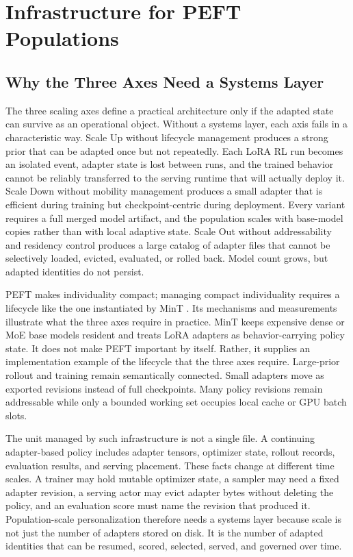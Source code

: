 \documentclass{llmxive}
\providecommand{\pony}[1]{#1}
\begin{document}
\section{\pony{Infrastructure for PEFT Populations}}\label{sec:infrastructure}

\subsection{\pony{Why the Three Axes Need a Systems Layer}}\label{subsec:infra-three-axes}

\pony{The three scaling axes define a practical architecture only if the adapted state can survive as an operational object. Without a systems layer, each axis fails in a characteristic way. Scale Up without lifecycle management produces a strong prior that can be adapted once but not repeatedly. Each LoRA RL run becomes an isolated event, adapter state is lost between runs, and the trained behavior cannot be reliably transferred to the serving runtime that will actually deploy it. Scale Down without mobility management produces a small adapter that is efficient during training but checkpoint-centric during deployment. Every variant requires a full merged model artifact, and the population scales with base-model copies rather than with local adaptive state. Scale Out without addressability and residency control produces a large catalog of adapter files that cannot be selectively loaded, evicted, evaluated, or rolled back. Model count grows, but adapted identities do not persist.}

\pony{PEFT makes individuality compact; managing compact individuality requires a lifecycle like the one instantiated by MinT \citep{mindlab2026mint}. Its mechanisms and measurements illustrate what the three axes require in practice. MinT keeps expensive dense or MoE base models resident and treats LoRA adapters as behavior-carrying policy state. It does not make PEFT important by itself. Rather, it supplies an implementation example of the lifecycle that the three axes require. Large-prior rollout and training remain semantically connected. Small adapters move as exported revisions instead of full checkpoints. Many policy revisions remain addressable while only a bounded working set occupies local cache or GPU batch slots.}

\pony{The unit managed by such infrastructure is not a single file. A continuing adapter-based policy includes adapter tensors, optimizer state, rollout records, evaluation results, and serving placement. These facts change at different time scales. A trainer may hold mutable optimizer state, a sampler may need a fixed adapter revision, a serving actor may evict adapter bytes without deleting the policy, and an evaluation score must name the revision that produced it. Population-scale personalization therefore needs a systems layer because scale is not just the number of adapters stored on disk. It is the number of adapted identities that can be resumed, scored, selected, served, and governed over time.}
\end{document}
